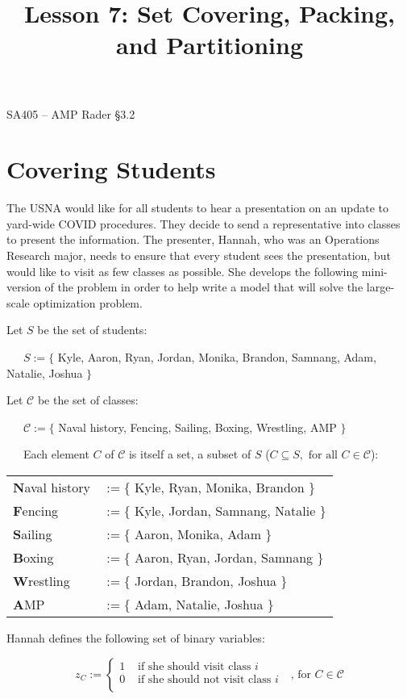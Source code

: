 \documentclass[11pt]{article}
\makeatletter
\theoremstyle{definition}
\renewcommand{\maketitle}{
  \noindent SA405 -- AMP \hfill Rader \S 3.2 \\

  \begin{center}\Large{\textbf{\@title}}\end{center}
}
\makeatother
\begin{document}
  
\title{Lesson 7: Set Covering, Packing, and Partitioning}

\maketitle


\section{Covering Students}
The USNA would like for all students to hear a presentation on an update to yard-wide COVID procedures.  They decide to send a representative into classes to present the information.  The presenter, Hannah, who was an Operations Research major, needs to ensure that every student sees the presentation, but would like to visit as few classes as possible.  She develops the following mini-version of the problem in order to help write a model that will solve the large-scale optimization problem.

Let $S$ be the set of students:

~~~$S := \{$ Kyle, Aaron, Ryan, Jordan, Monika, Brandon, Samnang, Adam, Natalie, Joshua $\}$

Let $\mathscr{C}$ be the set of classes:

~~~$\mathscr{C} := \{$ Naval history, Fencing, Sailing, Boxing, Wrestling, AMP $\}$

~~~Each element $C$ of $\mathscr{C}$ is itself a set, a subset of $S$ ($C \subseteq S, \text{ for all } C \in \mathscr{C}$):
\begin{center}
\begin{tabular}{ll}
{\bf N}aval history &$:= \{$ Kyle, Ryan, Monika, Brandon $\}$\\
{\bf F}encing &$:= \{$ Kyle, Jordan, Samnang, Natalie $\}$\\
{\bf S}ailing &$:= \{$ Aaron, Monika, Adam $\}$\\
{\bf B}oxing &$:= \{$ Aaron, Ryan, Jordan, Samnang $\}$\\
{\bf W}restling &$:= \{$ Jordan, Brandon, Joshua $\}$\\
{\bf A}MP &$:= \{$ Adam, Natalie, Joshua $\}$\\
\end{tabular}
\end{center}

\bigskip
Hannah defines the following set of binary variables:

\[
z_C := \left\{ \begin{array}{ll}
1 & \text{ if she should visit class $i$ } \\
0 & \text{ if she should not visit class $i$ } \\
\end{array} \right. \text{, for $C \in \mathscr{C}$}
\]
\end{document}
